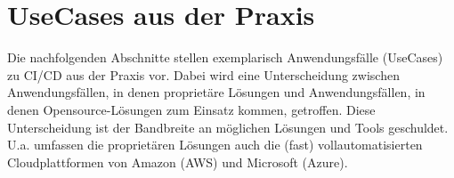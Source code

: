 \section{UseCases aus der Praxis}
\label{UseCases aus der Praxis}
Die nachfolgenden Abschnitte stellen exemplarisch Anwendungsfälle (UseCases) zu \acrshort{CI}/\acrshort{CD} aus der Praxis vor. Dabei wird eine Unterscheidung zwischen Anwendungsfällen, in denen proprietäre Lösungen und Anwendungsfällen, in denen Opensource-Lösungen zum Einsatz kommen, getroffen. Diese Unterscheidung ist der Bandbreite an möglichen Lösungen und Tools geschuldet. U.a. umfassen die proprietären Lösungen auch die (fast) vollautomatisierten Cloudplattformen von Amazon (\acrshort{AWS}) und Microsoft (Azure).